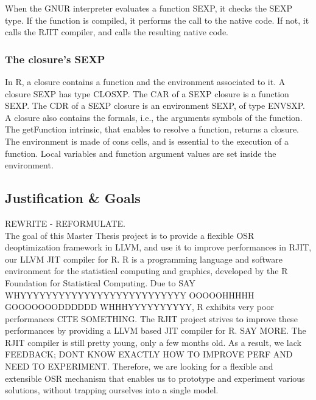 When the GNUR interpreter evaluates a function SEXP, it checks the SEXP type. 
If the function is compiled, it performs the call to the native code. 
If not, it calls the RJIT compiler, and calls the resulting native code.\\

\subsubsection{The closure's SEXP}
In R, a closure contains a function and the environment associated to it.
A closure SEXP has type CLOSXP.
The CAR of a SEXP closure is a function SEXP.
The CDR of a SEXP closure is an environment SEXP, of type ENVSXP.
A closure also contains the formals, i.e., the arguments symbols of the function.
The getFunction intrinsic, that enables to resolve a function, returns a closure.
The environment is made of cons cells, and is essential to the execution of a function.
Local variables and function argument values are set inside the environment.\\

\subsection{Justification \& Goals}
REWRITE - REFORMULATE.\\
            

The goal of this Master Thesis project is to provide a flexible OSR deoptimization framework in LLVM, and use it to improve performances in RJIT, our LLVM JIT compiler for R.
R is a programming language and software environment for the statistical computing and graphics, developed by the R Foundation for Statistical Computing\cite{RURL}.
Due to SAY WHYYYYYYYYYYYYYYYYYYYYYYYYYY OOOOOHHHHH GOOOOOOODDDDDD WHHHYYYYYYYYYY, R exhibits very poor performances CITE SOMETHING.
The RJIT project strives to improve these performances by providing a LLVM based JIT compiler for R. SAY MORE.
The RJIT compiler is still pretty young, only a few months old.
As a result, we lack FEEDBACK; DONT KNOW EXACTLY HOW TO IMPROVE PERF AND NEED TO EXPERIMENT.
Therefore, we are looking for a flexible and extensible OSR mechanism that enables us to prototype and experiment various solutions, without trapping ourselves into a single model.\\

